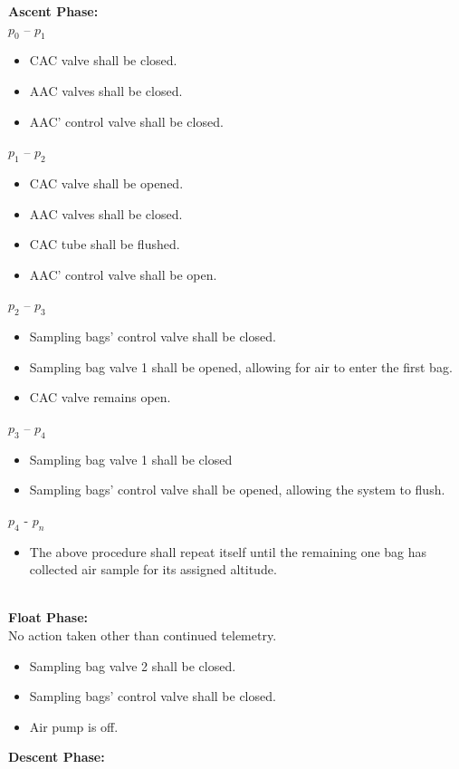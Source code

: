 \textbf{Ascent Phase:}\\
$p_0$ – $p_1$
\begin{itemize}
    \item CAC valve shall be closed.
    \item AAC valves shall be closed.
    \item AAC' control valve shall be closed.
    \end{itemize}
$p_1$ – $p_2$
\begin{itemize}
    \item CAC valve shall be opened.
    \item AAC valves shall be closed.
    \item CAC tube shall be flushed.
    \item AAC' control valve shall be open.
    \end{itemize}
$p_2$ – $p_3$
\begin{itemize}
    \item Sampling bags' control valve shall be closed.
    \item Sampling bag valve 1 shall be opened, allowing for air to enter the first bag.
    \item CAC valve remains open.
    \end{itemize}
$p_3$ – $p_4$
\begin{itemize}
    \item Sampling bag valve 1 shall be closed
    \item Sampling bags' control valve shall be opened, allowing the system to flush. 
    \end{itemize}
$p_4$ - $p_n$
\begin{itemize}
    \item The above procedure shall repeat itself until the remaining one bag has collected air sample for its assigned altitude.
    \end{itemize}



\textbf{\\Float Phase:}\\
No action taken other than continued telemetry.
\begin{itemize}
    \item Sampling bag valve 2 shall be closed.
    \item Sampling bags' control valve shall be closed.
    \item Air pump is off.
\end{itemize}
 
\textbf{Descent Phase:}

